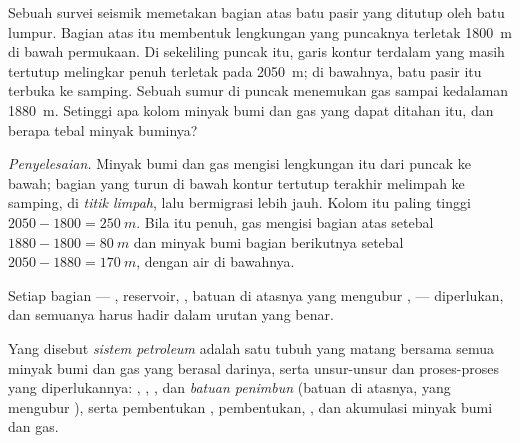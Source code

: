 \begin{example}\label{ex:g11:fossil-fuel-geology:anticline}
Sebuah survei seismik memetakan bagian atas batu pasir yang ditutup oleh batu
lumpur. Bagian atas itu membentuk lengkungan yang puncaknya terletak
\qty{1800}{m} di bawah permukaan. Di sekeliling puncak itu, garis kontur
terdalam yang masih tertutup melingkar penuh terletak pada \qty{2050}{m}; di
bawahnya, batu pasir itu terbuka ke samping. Sebuah sumur di puncak menemukan
gas sampai kedalaman \qty{1880}{m}. Setinggi apa kolom minyak bumi dan gas yang
dapat ditahan  itu, dan berapa tebal minyak buminya?

\emph{Penyelesaian.} Minyak bumi dan gas mengisi lengkungan itu dari puncak ke
bawah; bagian yang turun di bawah kontur tertutup terakhir melimpah ke samping,
di \emph{titik limpah}, lalu bermigrasi lebih jauh. Kolom itu paling tinggi
$2050 - 1800 = \qty{250}{m}$. Bila  itu penuh, gas mengisi bagian
atas setebal $1880 - 1800 = \qty{80}{m}$ dan minyak bumi bagian berikutnya
setebal $2050 - 1880 = \qty{170}{m}$, dengan air di bawahnya.
\end{example}

Setiap bagian --- , reservoir, , batuan di atasnya
yang mengubur ,  --- diperlukan, dan semuanya harus hadir
dalam urutan yang benar.

\begin{definition}\label{def:g11:fossil-fuel-geology:petroleum-system}
Yang disebut \emph{sistem petroleum} adalah satu tubuh
 yang matang bersama semua minyak bumi dan gas yang berasal darinya,
serta unsur-unsur dan proses-proses yang diperlukannya: , , , dan \emph{batuan penimbun}
(batuan di atasnya, yang mengubur ), serta pembentukan ,
pembentukan, , dan akumulasi minyak bumi dan gas.
\end{definition}

